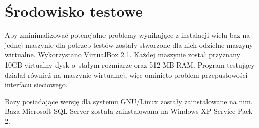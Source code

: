 

\section{Środowisko testowe}

Aby zminimalizować potencjalne problemy wynikające z instalacji wielu baz na 
jednej maszynie dla potrzeb testów zostały stworzone dla nich odzielne maszyny wirtualne. 
Wykorzystano VirtualBox 2.1. Każdej maszynie został przyznany 10GB virtualny dysk 
o~stałym rozmiarze oraz 512 MB RAM. Program testujący działał również na maszynie wirtualnej, 
więc ominięto problem przepustowości interfacu sieciowego. 

Bazy posiadające wersję dla systemu GNU/Linux zostały zainstalowane na nim. 
Baza Microsoft SQL Server została zainstalowana na Windows XP Service Pack 2.

